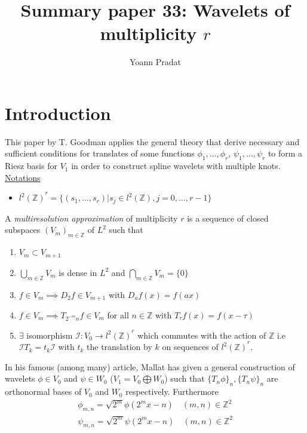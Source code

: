 \documentclass[a4paper, 11pt]{article}
\begin{document}
\title{Summary paper 33: Wavelets of multiplicity $r$}
\author{Yoann Pradat}
\maketitle

\section{Introduction}

This paper by T. Goodman applies the general theory that derive necessary and sufficient conditions for translates of 
some functions $\phi_1, \ldots, \phi_r$, $\psi_1, \ldots, \psi_r$ to form a Riesz basis for $V_1$ in order to construct 
spline wavelets with multiple knots. \\

\underline{Notations}
\begin{itemize}
  \item ${l^2(\mathbb{Z})}^r = \{(s_1, \ldots, s_r) | s_j \in l^2(\mathbb{Z}), j=0, \ldots, r-1\}$
\end{itemize}

\begin{deftn}{1}
  A \emph{multiresolution approximation} of multiplicity $r$ is a sequence of closed subspaces ${(V_m)}_{m \in 
  \mathbb{Z}}$ of $L^2$ such that
  \begin{enumerate}
    \item $V_m \subset V_{m+1}$
    \item $\bigcup_{m \in \mathbb{Z}} V_m$ is dense in $L^2$ and $\bigcap_{m \in \mathbb{Z}} V_m = \{0\}$
    \item $f \in V_m \implies D_2f \in V_{m+1}$ with $D_a f(x) = f(ax)$
    \item $f \in V_m \implies T_{2^{-m}n}f \in V_m$ for all $n \in \mathbb{Z}$ with $T_{\tau}f(x) = f(x-\tau)$
    \item $\exists$ isomorphism $\mathcal{I}: V_0\to{l^2(\mathbb{Z})}^r$ which commutes with the action of $\mathbb{Z}$
      i.e $\mathcal{I}T_k = t_k \mathcal{I}$ with $t_k$ the translation by $k$ on sequences of ${l^2(\mathbb{Z})}^r$.
  \end{enumerate}
\end{deftn}

In his famous (among many) article\cite{Mallat}, Mallat has given a general construction of wavelets $\phi \in V_0$ and 
$\psi \in W_0$ ($V_1 = V_0 \bigoplus W_0$) such that ${\{T_n \phi\}}_n, {\{T_n \psi \}}_n$ are orthonormal bases of 
$V_0$ and $W_0$ respectively.  Furthermore
\begin{align*}
  \phi_{m,n} = \sqrt{2^m} \phi(2^m x-n) \quad (m,n) \in \mathbb{Z}^2 \\
  \psi_{m,n} = \sqrt{2^m} \psi(2^m x-n) \quad (m,n) \in \mathbb{Z}^2 
\end{align*}
\end{document}
